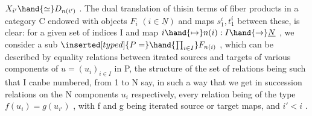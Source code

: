 $X_{i'} \hand{\simeq} D_{n(i')}$ .  The  dual translation of this\hand{,}in terms\hand{\unsure{$\vert$}} of fiber
products in  a category C endowed with objects $F_i$ $(i\in\underline{N})$ and maps
$s_1^i , t_1^i$ between these, is clear:  for a given set of indices I and map
$i \hand{\mapsto} n(i) : I \hand{\to} \underline{N}$ , we consider a sub $\inserted[typed]{P=}\hand{\prod_{i\in I}}F_{n(i)}$ ,  which can be
described by equality relations between itrated sources and targets
 of various components of $u = (u_i)_{i\in I}$  in P,  the structure of
the set of relations being such that I can\hand{\unsure{,}}be numbered, from 1 to N say,
in such a way that we get in succession  relations on the N components
$u_i$ respectively, every relation being of the type $f(u_i) = g(u_{i'})$ , with
f and g being iterated source or target maps, and $i'<i$ . 

